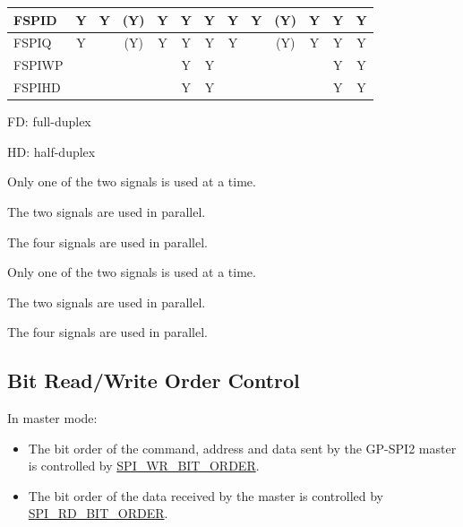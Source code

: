 \documentclass[main\_\_EN.tex]{subfiles}
\begin{document}
\begin{landscape}
\begin{table}[H]
\begin{threeparttable}
\begin{tabular}{ |p{2.0cm} |c|c|c|c|c|c|c|c|c|c|c|c| }
FSPID                    & Y       & Y       & (Y)\tnote{3}      & Y\tnote{4}      & Y\tnote{5}      & Y      & Y       & Y      & (Y)\tnote{6}      & Y\tnote{7}     & Y\tnote{8}     & Y      \\ \hline
FSPIQ                    & Y       &         & (Y)\tnote{3}      & Y\tnote{4}      & Y\tnote{5}      & Y      & Y       &        & (Y)\tnote{6}     & Y\tnote{7}     & Y\tnote{8}      & Y      \\ \hline
FSPIWP                   &         &         &         &         & Y\tnote{5}      & Y      &         &        &         &         & Y\tnote{8}       & Y      \\ \hline
FSPIHD                   &         &         &         &         & Y\tnote{5}      & Y      &         &        &         &         & Y\tnote{8}       & Y      \\ \hline
\end{tabular}

        \begin{tablenotes}
                \item[1] FD: full-duplex
                \item[2] HD: half-duplex
                \item[3] Only one of the two signals is used at a time.
                \item[4] The two signals are used in parallel.
                \item[5] The four signals are used in parallel.
                \item[6] Only one of the two signals is used at a time.
                \item[7] The two signals are used in parallel.
                \item[8] The four signals are used in parallel.
        \end{tablenotes}
     \end{threeparttable}
    \end{table}
\end{landscape}

\subsection{Bit Read/Write Order Control}

In master mode:

\begin{itemize}
    \item The bit order of the command, address and data sent by the GP-SPI2 master is controlled by \hyperref[fielddesc:SPIWRBITORDER]{SPI\_WR\_BIT\_ORDER}.
    \item The bit order of the data received by the master is controlled by \hyperref[fielddesc:SPIRDBITORDER]{SPI\_RD\_BIT\_ORDER}.
\end{itemize}
\end{document}
